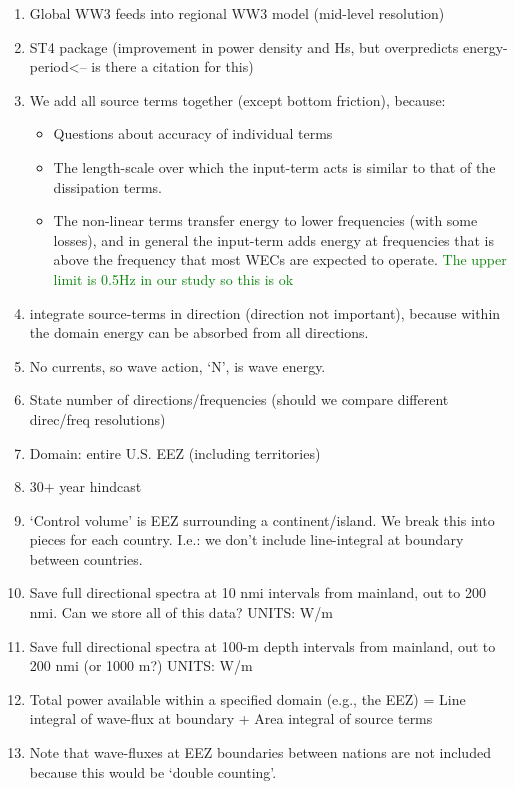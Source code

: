 \begin{enumerate}
\item Global WW3 feeds into regional WW3 model (mid-level resolution)
\item ST4 package (improvement in power density and Hs, but overpredicts energy-period<-- is there a citation for this)
\item We add all source terms together (except bottom friction), because:
  \begin{itemize}
  \item Questions about accuracy of individual terms \citep{garcia-medinaWaveResourceAssessment2014}
  \item The length-scale over which the input-term acts is similar to that of the dissipation terms.
  \item The non-linear terms transfer energy to lower frequencies (with some losses), and in general the input-term adds energy at frequencies that is above the frequency that most WECs are expected to operate.  \textcolor{green}{The upper limit is 0.5Hz in our study so this is ok}
  \end{itemize}
\item integrate source-terms in direction (direction not important), because within the domain energy can be absorbed from all directions.
\item No currents, so wave action, ‘N’, is wave energy.
\item State number of directions/frequencies (should we compare different direc/freq resolutions)
\item Domain: entire U.S. EEZ (including territories)
\item 30+ year hindcast
\item ‘Control volume’ is EEZ surrounding a continent/island. We break this into pieces for each country. I.e.: we don’t include line-integral at boundary between countries.
\item Save full directional spectra at 10 nmi intervals from mainland, out to 200 nmi. Can we store all of this data? UNITS: W/m
\item Save full directional spectra at 100-m depth intervals from mainland, out to 200 nmi (or 1000 m?) UNITS: W/m
\item Total power available within a specified domain (e.g., the EEZ) = Line integral of wave-flux at boundary + Area integral of source terms
\item Note that wave-fluxes at EEZ boundaries between nations are not included because this would be ‘double counting’.
\end{enumerate}


